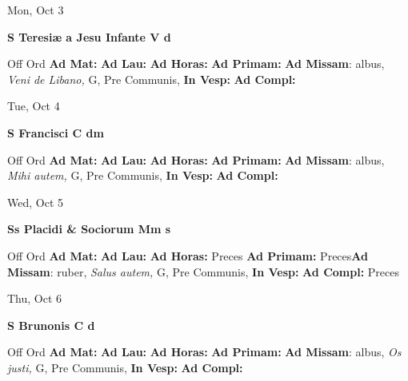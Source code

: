 \documentclass[10pt]{book}
\begin{document}
\begin{center}
\begin{minipage}{3.5in}
\vspace{2em}
\begin{center}Mon, Oct 3
\end{center}
\textbf{ \large S Teresiæ a Jesu Infante V
\textnormal{\normalsize d}}

\begin{justify}Off Ord
\textbf{Ad Mat: }
\textbf{Ad Lau: }
\textbf{Ad Horas: }
\textbf{Ad Primam: }\textbf{Ad Missam}: albus, \textit{Veni de Libano,} G, Pre Communis, 
\textbf{In Vesp: }
\textbf{Ad Compl: }
\end{justify}
\end{minipage}
\end{center}

\begin{center}
\begin{minipage}{3.5in}
\vspace{2em}
\begin{center}Tue, Oct 4
\end{center}
\textbf{ \large S Francisci C
\textnormal{\normalsize dm}}

\begin{justify}Off Ord
\textbf{Ad Mat: }
\textbf{Ad Lau: }
\textbf{Ad Horas: }
\textbf{Ad Primam: }\textbf{Ad Missam}: albus, \textit{Mihi autem,} G, Pre Communis, 
\textbf{In Vesp: }
\textbf{Ad Compl: }
\end{justify}
\end{minipage}
\end{center}

\begin{center}
\begin{minipage}{3.5in}
\vspace{2em}
\begin{center}Wed, Oct 5
\end{center}
\textbf{ \large Ss Placidi \& Sociorum Mm
\textnormal{\normalsize s}}

\begin{justify}Off Ord
\textbf{Ad Mat: }
\textbf{Ad Lau: }
\textbf{Ad Horas: }Preces
\textbf{Ad Primam: }Preces\textbf{Ad Missam}: ruber, \textit{Salus autem,} G, Pre Communis, 
\textbf{In Vesp: }
\textbf{Ad Compl: }Preces
\end{justify}
\end{minipage}
\end{center}

\begin{center}
\begin{minipage}{3.5in}
\vspace{2em}
\begin{center}Thu, Oct 6
\end{center}
\textbf{ \large S Brunonis C
\textnormal{\normalsize d}}

\begin{justify}Off Ord
\textbf{Ad Mat: }
\textbf{Ad Lau: }
\textbf{Ad Horas: }
\textbf{Ad Primam: }\textbf{Ad Missam}: albus, \textit{Os justi,} G, Pre Communis, 
\textbf{In Vesp: }
\textbf{Ad Compl: }
\end{justify}
\end{minipage}
\end{center}
\end{document}
